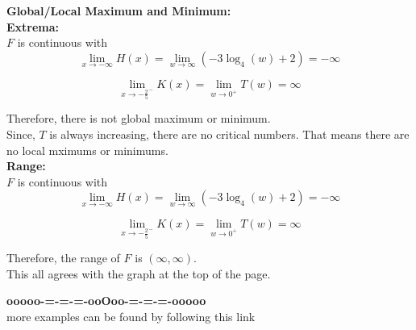 \documentclass{ximera}
\begin{document}
\textbf{\textcolor{blue!55!black}{Global/Local Maximum and Minimum:}} \\
\textbf{Extrema:} \\

$F$ is continuous with \\




\[
\lim\limits_{x \to -\infty} H(x)  = \lim\limits_{w \to \infty} (-3 \log_4(w) + 2)  = -\infty
\]



\[
\lim\limits_{x \to -\frac{2}{5}^-} K(x)  = \lim\limits_{w \to 0^+} T(w) = \infty
\]


Therefore, there is not global maximum or minimum. \\


Since, $T$ is always increasing, there are no critical numbers.  That means there are no local mximums or minimums. \\












\textbf{\textcolor{blue!55!black}{Range:}} \\


$F$ is continuous with \\




\[
\lim\limits_{x \to -\infty} H(x)  = \lim\limits_{w \to \infty} (-3 \log_4(w) + 2)  = -\infty
\]



\[
\lim\limits_{x \to -\frac{2}{5}^-} K(x)  = \lim\limits_{w \to 0^+} T(w) = \infty
\]


Therefore, the range of $F$ is $(\infty, \infty)$.\\





This all agrees with the graph at the top of the page. 






















\begin{center}
\textbf{\textcolor{green!50!black}{ooooo-=-=-=-ooOoo-=-=-=-ooooo}} \\

more examples can be found by following this link\\ 

\end{center}
\end{document}
